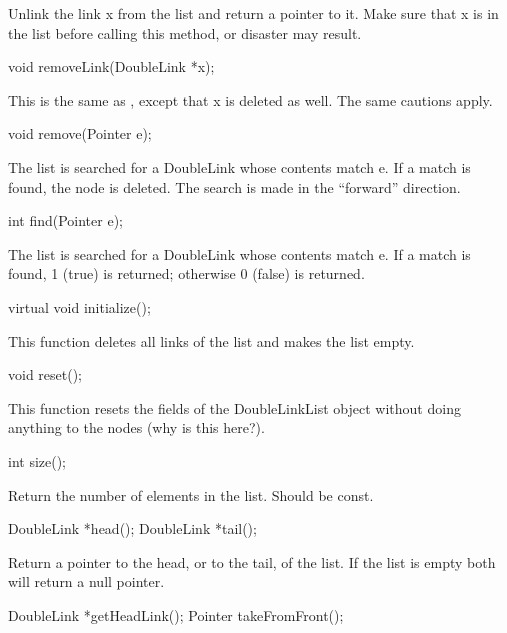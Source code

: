 Unlink the link x from the list and return a pointer to it.
Make sure that x is in the list before calling this method,
or disaster may result.

\begin{example}
void removeLink(DoubleLink *x);
\end{example}

This is the same as , except that x is deleted
as well.  The same cautions apply.

\begin{example}
void remove(Pointer e);
\end{example}

The list is searched for a DoubleLink whose contents match e.  If
a match is found, the node is deleted.  The search is made in the
``forward'' direction.

\begin{example}
int find(Pointer e);
\end{example}

The list is searched for a DoubleLink whose contents match e.  If
a match is found, 1 (true) is returned; otherwise 0 (false) is
returned.

\begin{example}
virtual void initialize();
\end{example}

This function deletes all links of the list and makes the list empty.

\begin{example}
void reset();
\end{example}

This function resets the fields of the DoubleLinkList object without
doing anything to the nodes (why is this here?).

\begin{example}
int size();
\end{example}

Return the number of elements in the list.  Should be const.

\begin{example}
DoubleLink *head();
DoubleLink *tail();
\end{example}

Return a pointer to the head, or to the tail, of the list.  If
the list is empty both will return a null pointer.

\begin{example}
DoubleLink *getHeadLink();
Pointer takeFromFront();
\end{example}

